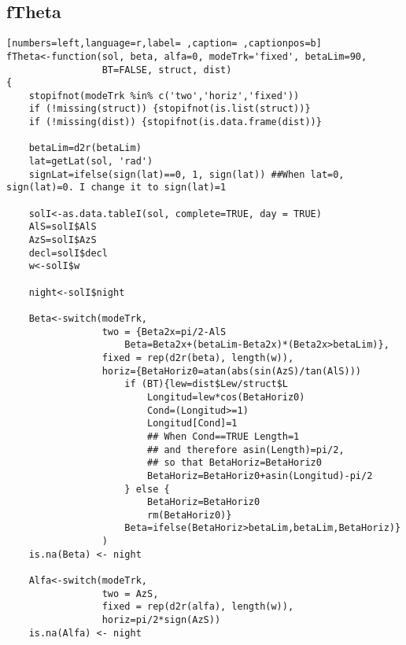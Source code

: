 \subsection{fTheta}
\label{sec:org514fcb4}
\begin{lstlisting}[numbers=left,language=r,label= ,caption= ,captionpos=b]
fTheta<-function(sol, beta, alfa=0, modeTrk='fixed', betaLim=90, 
                 BT=FALSE, struct, dist)
{
    stopifnot(modeTrk %in% c('two','horiz','fixed'))
    if (!missing(struct)) {stopifnot(is.list(struct))}
    if (!missing(dist)) {stopifnot(is.data.frame(dist))}

    betaLim=d2r(betaLim)
    lat=getLat(sol, 'rad')
    signLat=ifelse(sign(lat)==0, 1, sign(lat)) ##When lat=0, sign(lat)=0. I change it to sign(lat)=1

    solI<-as.data.tableI(sol, complete=TRUE, day = TRUE)
    AlS=solI$AlS
    AzS=solI$AzS
    decl=solI$decl
    w<-solI$w

    night<-solI$night

    Beta<-switch(modeTrk,
                 two = {Beta2x=pi/2-AlS	
                     Beta=Beta2x+(betaLim-Beta2x)*(Beta2x>betaLim)},
                 fixed = rep(d2r(beta), length(w)), 
                 horiz={BetaHoriz0=atan(abs(sin(AzS)/tan(AlS)))
                     if (BT){lew=dist$Lew/struct$L
                         Longitud=lew*cos(BetaHoriz0)
                         Cond=(Longitud>=1)
                         Longitud[Cond]=1
                         ## When Cond==TRUE Length=1
                         ## and therefore asin(Length)=pi/2,
                         ## so that BetaHoriz=BetaHoriz0
                         BetaHoriz=BetaHoriz0+asin(Longitud)-pi/2                                     
                     } else {
                         BetaHoriz=BetaHoriz0
                         rm(BetaHoriz0)}
                     Beta=ifelse(BetaHoriz>betaLim,betaLim,BetaHoriz)}
                 )
    is.na(Beta) <- night

    Alfa<-switch(modeTrk,
                 two = AzS,
                 fixed = rep(d2r(alfa), length(w)),
                 horiz=pi/2*sign(AzS))
    is.na(Alfa) <- night


\end{lstlisting}
